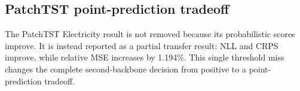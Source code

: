 \subsection{PatchTST point-prediction tradeoff}

The PatchTST Electricity result is not removed because its probabilistic scores improve. It is instead reported as a partial transfer result: NLL and CRPS improve, while relative MSE increases by 1.194\%. This single threshold miss changes the complete second-backbone decision from positive to a point-prediction tradeoff.
